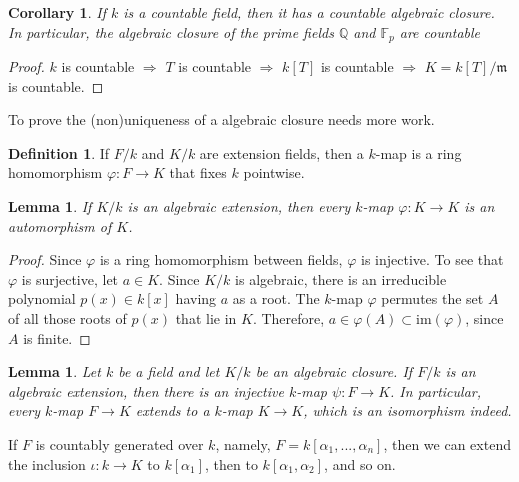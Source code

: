 \documentclass[12pt]{report}
\newtheorem{cor}[thm]{Corollary}
\newtheorem{lemma}[thm]{Lemma}
\theoremstyle{definition}
\newtheorem{defn}[thm]{Definition}
\def\QQ{\mathbb{Q}}
\def\FF{\mathbb{F}}
\def\im{\text{im}}
\def\aa{\alpha}
\def\mm{\mathfrak{m}}
\begin{document}
\begin{cor}
    If $k$ is a countable field, then it has a countable algebraic closure. In particular, the algebraic closure of the prime fields $\QQ$ and $\FF_p$ are countable 
\end{cor}

\begin{proof}
    $k$ is countable $\Longrightarrow$ $T$ is countable $\Longrightarrow$ $k[T]$ is countable $\Longrightarrow$ $K=k[T]/\mm$ is countable.
\end{proof}

To prove the (non)uniqueness of a algebraic closure needs more work.

\begin{defn}
    If $F/k$ and $K/k$ are extension fields, then a $k$-map is a ring homomorphism $\varphi : F \to K$ that fixes $k$ pointwise.
\end{defn}

\begin{lemma}\label{ac5}
    If $K/k$ is an algebraic extension, then every $k$-map $\varphi: K \to K$ is an automorphism of $K$.
\end{lemma}

\begin{proof}
   Since $\varphi$ is a ring homomorphism between fields, $\varphi$ is injective. To see that $\varphi$ is surjective, let $a \in K$. Since $K/k$ is algebraic, there is an irreducible polynomial $p(x) \in k[x]$ having $a$ as a root. The $k$-map $\varphi$ permutes the set $A$ of all those roots of $p(x)$ that lie in $K$. Therefore, $a \in \varphi(A) \subset  \im(\varphi)$, since $A$ is finite.
\end{proof}

\begin{lemma}\label{extensionlemma}
    Let $k$ be a field and let $K/k$ be an algebraic closure. If $F/k$ is an algebraic extension, then there is an injective $k$-map $\psi: F \to K$. In particular, every $k$-map $F\to K$ extends to a $k$-map $K\to K$, which is an isomorphism indeed.
\end{lemma}

If $F$ is countably generated over $k$, namely, $F=k[\aa_1,...,\aa_n]$, then we can extend the inclusion $\iota: k\to K$ to $k[\aa_1]$, then to $k[\aa_1,\aa_2]$, and so on. 
\end{document}
